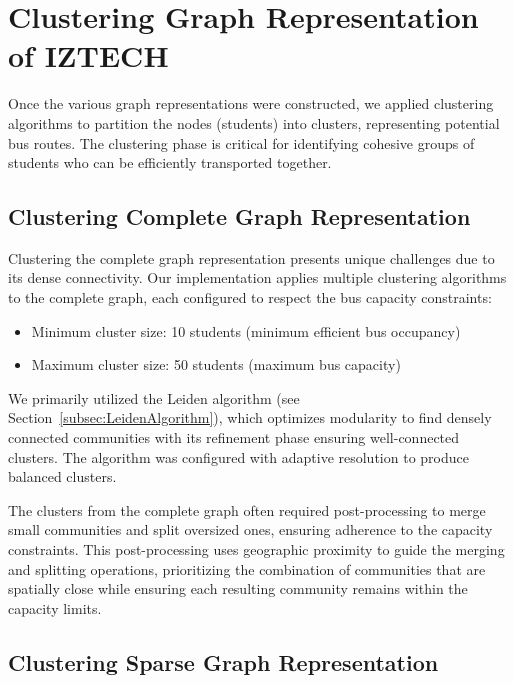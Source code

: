 \section{Clustering Graph Representation of IZTECH}
\label{sec:clustering_graph}

Once the various graph representations were constructed, we applied clustering algorithms to partition the nodes (students) into clusters, representing potential bus routes. The clustering phase is critical for identifying cohesive groups of students who can be efficiently transported together.

\subsection{Clustering Complete Graph Representation}
\label{subsec:clustering_complete}

Clustering the complete graph representation presents unique challenges due to its dense connectivity. Our implementation applies multiple clustering algorithms to the complete graph, each configured to respect the bus capacity constraints:

\begin{itemize}
    \item Minimum cluster size: 10 students (minimum efficient bus occupancy)
    \item Maximum cluster size: 50 students (maximum bus capacity)
\end{itemize}

We primarily utilized the Leiden algorithm (see Section~\ref{subsec:LeidenAlgorithm}), which optimizes modularity to find densely connected communities with its refinement phase ensuring well-connected clusters. The algorithm was configured with adaptive resolution to produce balanced clusters.

The clusters from the complete graph often required post-processing to merge small communities and split oversized ones, ensuring adherence to the capacity constraints. This post-processing uses geographic proximity to guide the merging and splitting operations, prioritizing the combination of communities that are spatially close while ensuring each resulting community remains within the capacity limits.

\subsection{Clustering Sparse Graph Representation}
\label{subsec:clustering_sparse}

